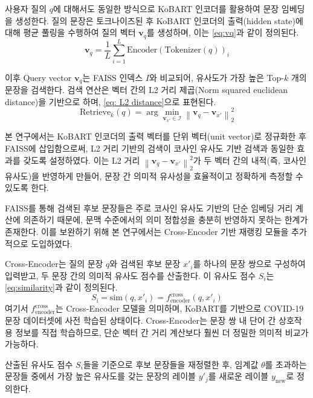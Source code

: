 \documentclass[a4paper,fleqn]{cas-sc}
\begin{document}
사용자 질의 \( q \)에 대해서도 동일한 방식으로 KoBART 인코더를 활용하여 문장 임베딩을 생성한다. 질의 문장은 토크나이즈된 후 KoBART 인코더의 출력(hidden state)에 대해 평균 풀링을 수행하여 질의 벡터 \( \mathbf{v}_{q} \)를 생성하며, 이는 \cref{eq:vq}과 같이 정의된다. 
\begin{equation}
    \mathbf{v}_q = \frac{1}{L} \sum_{i=1}^{L} \mathrm{Encoder}(\mathrm{Tokenizer}(q))_i
    \label{eq:vq}
\end{equation}

이후 Query vector \( \mathbf{v}_{q} \)는 FAISS 인덱스 \( I \)와 비교되어, 유사도가 가장 높은 Top-\( k \) 개의 문장을 검색한다. 
검색 연산은 벡터 간의 L2 거리 제곱(Norm squared euclidean distance)을 기반으로 하며, \cref{eq: L2 distance}으로 표현된다.
\begin{equation}
    \mathrm{Retrieve}_k(q) = \arg\min_{\mathbf{v}_{x'} \in \mathcal{I}} \left\| \mathbf{v}_q - \mathbf{v}_{x'} \right\|_2^2
    \label{eq: L2 distance}
\end{equation}

본 연구에서는 KoBART 인코더의 출력 벡터를 단위 벡터(unit vector)로 정규화한 후 FAISS에 삽입함으로써, L2 거리 기반의 검색이 코사인 유사도 기반 검색과 동일한 효과를 갖도록 설정하였다. 이는 L2 거리 \( \left\| \mathbf{v}_q - \mathbf{v}_{x'} \right\|_2^2 \)가 두 벡터 간의 내적(즉, 코사인 유사도)을 반영하게 만들어, 문장 간 의미적 유사성을 효율적이고 정확하게 측정할 수 있도록 한다.

FAISS를 통해 검색된 후보 문장들은 주로 코사인 유사도 기반의 단순 임베딩 거리 계산에 의존하기 때문에, 문맥 수준에서의 의미 정합성을 충분히 반영하지 못하는 한계가 존재한다. 이를 보완하기 위해 본 연구에서는 Cross-Encoder 기반 재랭킹 모듈을 추가적으로 도입하였다. 

Cross-Encoder는 질의 문장 \( q \)와 검색된 후보 문장 \( x'_i \)를 하나의 문장 쌍으로 구성하여 입력받고, 두 문장 간의 의미적 유사도 점수를 산출한다. 이 유사도 점수 \( S_i \)는 \cref{eq:similarity}과 같이 정의된다.
\begin{equation}
    S_{\text{i}} = \mathrm{sim}(q, x'_i) = f_{\text{encoder}}^{\text{cross}}(q, x'_i)
    \label{eq:similarity}
\end{equation}
\noindent
여기서 $f_{\text{encoder}}^{\text{cross}}$는 Cross-Encoder 모델을 의미하며, KoBART를 기반으로 COVID-19 문장 데이터셋에 사전 학습된 상태이다. Cross-Encoder는 문장 쌍 내 단어 간 상호작용 정보를 직접 학습하므로, 단순 벡터 간 거리 계산보다 훨씬 더 정밀한 의미적 비교가 가능하다.

산출된 유사도 점수 \( S_i \)들을 기준으로 후보 문장들을 재정렬한 후, 임계값 $\theta$를 초과하는 문장들 중에서 가장 높은 유사도를 갖는 문장의 레이블  $y'_j$​를 새로운 레이블 $y_{\text{new}}$로 정의한다.
\end{document}
